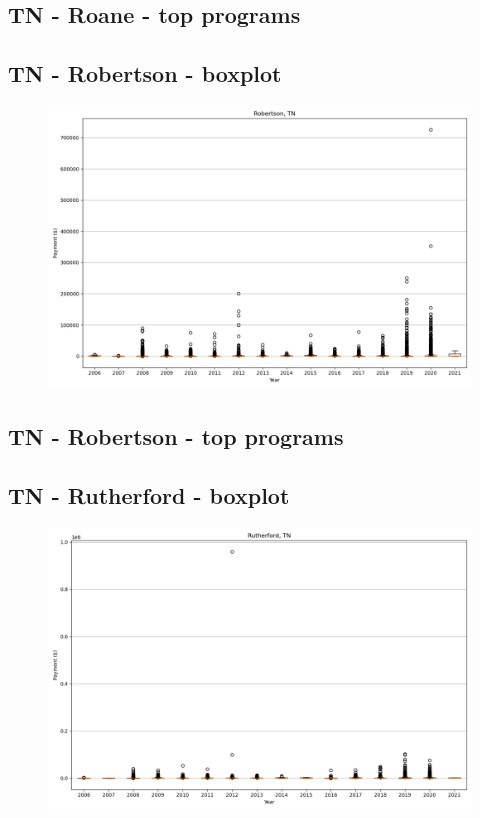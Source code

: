 \subsection*{TN - Roane - top programs}

\newpage
\subsection*{TN - Robertson - boxplot}
\begin{figure}[h]
\centering
\includegraphics[width=7in]{../output/boxplots/counties/Robertson-TN_boxplot.png}
\end{figure}


\subsection*{TN - Robertson - top programs}

\newpage
\subsection*{TN - Rutherford - boxplot}
\begin{figure}[h]
\centering
\includegraphics[width=7in]{../output/boxplots/counties/Rutherford-TN_boxplot.png}
\end{figure}


